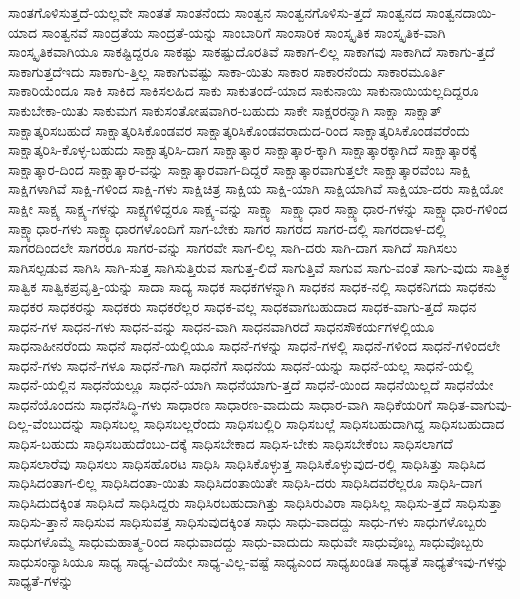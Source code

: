 {ಸಾಂತಗೊಳಿಸುತ್ತದೆ-ಯಲ್ಲವೇ
ಸಾಂತತೆ
ಸಾಂತನೆಂದು
ಸಾಂತ್ವನ
ಸಾಂತ್ವನಗೊಳಿಸು-ತ್ತದೆ
ಸಾಂತ್ವನದ
ಸಾಂತ್ವನದಾಯಿ-ಯಾದ
ಸಾಂತ್ವನವೆ
ಸಾಂದ್ರತೆಯ
ಸಾಂದ್ರತೆ-ಯನ್ನು
ಸಾಂಬಾರಿಗೆ
ಸಾಂಸಾರಿಕ
ಸಾಂಸ್ಕೃತಿಕ
ಸಾಂಸ್ಕೃತಿಕ-ವಾಗಿ
ಸಾಂಸ್ಕೃತಿಕವಾಗಿಯೂ
ಸಾಕಷ್ಟಿದ್ದರೂ
ಸಾಕಷ್ಟು
ಸಾಕಷ್ಟುದೊರತಿವೆ
ಸಾಕಾಗ-ಲಿಲ್ಲ
ಸಾಕಾಗವು
ಸಾಕಾಗಿದೆ
ಸಾಕಾಗು-ತ್ತದೆ
ಸಾಕಾಗುತ್ತದೆಇದು
ಸಾಕಾಗು-ತ್ತಿಲ್ಲ
ಸಾಕಾಗುವಷ್ಟು
ಸಾಕಾ-ಯಿತು
ಸಾಕಾರ
ಸಾಕಾರನೆಂದು
ಸಾಕಾರಮೂರ್ತಿ
ಸಾಕಾರಿಯೆಂದೂ
ಸಾಕಿ
ಸಾಕಿದ
ಸಾಕಿಸಲಹಿದ
ಸಾಕು
ಸಾಕುತಂದೆ-ಯಾದ
ಸಾಕುನಾಯಿ
ಸಾಕುನಾಯಿಯಲ್ಲದಿದ್ದರೂ
ಸಾಕುಬೇಕಾ-ಯಿತು
ಸಾಕುಮಗ
ಸಾಕುಸಂತೋಷವಾಗಿರ-ಬಹುದು
ಸಾಕೇ
ಸಾಕ್ಷರರನ್ನಾಗಿ
ಸಾಕ್ಷಾ
ಸಾಕ್ಷಾತ್
ಸಾಕ್ಷಾತ್ಕರಿಸಬಹುದೆ
ಸಾಕ್ಷಾತ್ಕರಿಸಿಕೊಂಡವರ
ಸಾಕ್ಷಾತ್ಕರಿಸಿಕೊಂಡವರಾದುದ-ರಿಂದ
ಸಾಕ್ಷಾತ್ಕರಿಸಿಕೊಂಡವರೆಂದು
ಸಾಕ್ಷಾತ್ಕರಿಸಿ-ಕೊಳ್ಳ-ಬಹುದು
ಸಾಕ್ಷಾತ್ಕರಿಸಿ-ದಾಗ
ಸಾಕ್ಷಾತ್ಕಾರ
ಸಾಕ್ಷಾತ್ಕಾರ-ಕ್ಕಾಗಿ
ಸಾಕ್ಷಾತ್ಕಾರಕ್ಕಾಗಿದೆ
ಸಾಕ್ಷಾತ್ಕಾರಕ್ಕೆ
ಸಾಕ್ಷಾತ್ಕಾರ-ದಿಂದ
ಸಾಕ್ಷಾತ್ಕಾರ-ವನ್ನು
ಸಾಕ್ಷಾತ್ಕಾರವಾಗ-ದಿದ್ದರೆ
ಸಾಕ್ಷಾತ್ಕಾರವಾಗುತ್ತಲೇ
ಸಾಕ್ಷಾತ್ಕಾರವೆಂಬ
ಸಾಕ್ಷಿ
ಸಾಕ್ಷಿಗಳಾಗಿವೆ
ಸಾಕ್ಷಿ-ಗಳಿಂದ
ಸಾಕ್ಷಿ-ಗಳು
ಸಾಕ್ಷಿಚಿತ್ರ
ಸಾಕ್ಷಿಯ
ಸಾಕ್ಷಿ-ಯಾಗಿ
ಸಾಕ್ಷಿಯಾಗಿವೆ
ಸಾಕ್ಷಿಯಾ-ದರು
ಸಾಕ್ಷಿಯೋ
ಸಾಕ್ಷೀ
ಸಾಕ್ಷ್ಯ
ಸಾಕ್ಷ್ಯ-ಗಳನ್ನು
ಸಾಕ್ಷ್ಯಗಳಿದ್ದರೂ
ಸಾಕ್ಷ್ಯ-ವನ್ನು
ಸಾಕ್ಷ್ಯಾ
ಸಾಕ್ಷ್ಯಾಧಾರ
ಸಾಕ್ಷ್ಯಾಧಾರ-ಗಳನ್ನು
ಸಾಕ್ಷ್ಯಾಧಾರ-ಗಳಿಂದ
ಸಾಕ್ಷ್ಯಾಧಾರ-ಗಳು
ಸಾಕ್ಷ್ಯಾಧಾರಗಳೊಂದಿಗೆ
ಸಾಗ-ಬೇಕು
ಸಾಗರ
ಸಾಗರದ
ಸಾಗರ-ದಲ್ಲಿ
ಸಾಗರದಾಳ-ದಲ್ಲಿ
ಸಾಗರದಿಂದಲೇ
ಸಾಗರರೂ
ಸಾಗರ-ವನ್ನು
ಸಾಗರವೇ
ಸಾಗ-ಲಿಲ್ಲ
ಸಾಗಿ-ದರು
ಸಾಗಿ-ದಾಗ
ಸಾಗಿದೆ
ಸಾಗಿಸಲು
ಸಾಗಿಸಲ್ಪಡುವ
ಸಾಗಿಸಿ
ಸಾಗಿ-ಸುತ್ತ
ಸಾಗಿಸುತ್ತಿರುವ
ಸಾಗುತ್ತ-ಲಿದೆ
ಸಾಗುತ್ತಿವೆ
ಸಾಗುವ
ಸಾಗು-ವಂತೆ
ಸಾಗು-ವುದು
ಸಾತ್ತ್ವಿಕ
ಸಾತ್ವಿಕ
ಸಾತ್ವಿಕಪ್ರವೃತ್ತಿ-ಯನ್ನು
ಸಾದಾ
ಸಾದ್ಯ
ಸಾಧಕ
ಸಾಧಕಗಳನ್ನಾಗಿ
ಸಾಧಕನ
ಸಾಧಕ-ನಲ್ಲಿ
ಸಾಧಕನಿಗದು
ಸಾಧಕನು
ಸಾಧಕರ
ಸಾಧಕರನ್ನು
ಸಾಧಕರು
ಸಾಧಕರೆಲ್ಲರ
ಸಾಧಕ-ವಲ್ಲ
ಸಾಧಕವಾಗಬಹುದಾದ
ಸಾಧಕ-ವಾಗು-ತ್ತದೆ
ಸಾಧನ
ಸಾಧನ-ಗಳ
ಸಾಧನ-ಗಳು
ಸಾಧನ-ವನ್ನು
ಸಾಧನ-ವಾಗಿ
ಸಾಧನವಾಗಿರದೆ
ಸಾಧನಸೌಕರ್ಯಗಳಲ್ಲಿಯೂ
ಸಾಧನಾಹೀನರೆಂದು
ಸಾಧನೆ
ಸಾಧನೆ-ಯಲ್ಲಿಯೂ
ಸಾಧನೆ-ಗಳನ್ನು
ಸಾಧನೆ-ಗಳಲ್ಲಿ
ಸಾಧನೆ-ಗಳಿಂದ
ಸಾಧನೆ-ಗಳಿಂದಲೇ
ಸಾಧನೆ-ಗಳು
ಸಾಧನೆ-ಗಳೂ
ಸಾಧನೆ-ಗಾಗಿ
ಸಾಧನೆಗೆ
ಸಾಧನೆಯ
ಸಾಧನೆ-ಯನ್ನು
ಸಾಧನೆ-ಯಲ್ಲ
ಸಾಧನೆ-ಯಲ್ಲಿ
ಸಾಧನೆ-ಯಲ್ಲಿನ
ಸಾಧನೆಯಲ್ಲೂ
ಸಾಧನೆ-ಯಾಗಿ
ಸಾಧನೆಯಾಗು-ತ್ತದೆ
ಸಾಧನೆ-ಯಿಂದ
ಸಾಧನೆಯಿಲ್ಲದೆ
ಸಾಧನೆಯೇ
ಸಾಧನೆಯೊಂದನು
ಸಾಧನೆಸಿದ್ಧಿ-ಗಳು
ಸಾಧಾರಣ
ಸಾಧಾರಣ-ವಾದುದು
ಸಾಧಾರ-ವಾಗಿ
ಸಾಧಿಕೆಯರಿಗೆ
ಸಾಧಿತ-ವಾಗುವು-ದಿಲ್ಲ-ವೆಂಬುದನ್ನು
ಸಾಧಿಸಬಲ್ಲ
ಸಾಧಿಸಬಲ್ಲರೆಂದು
ಸಾಧಿಸಬಲ್ಲಿರಿ
ಸಾಧಿಸಬಲ್ಲೆ
ಸಾಧಿಸಬಹುದಾಗಿದ್ದ
ಸಾಧಿಸಬಹುದಾದ
ಸಾಧಿಸ-ಬಹುದು
ಸಾಧಿಸಬಹುದೆಂಬು-ದಕ್ಕೆ
ಸಾಧಿಸಬೇಕಾದ
ಸಾಧಿಸ-ಬೇಕು
ಸಾಧಿಸಬೇಕೆಂಬ
ಸಾಧಿಸಲಾಗದೆ
ಸಾಧಿಸಲಾರೆವು
ಸಾಧಿಸಲು
ಸಾಧಿಸಹೊರಟ
ಸಾಧಿಸಿ
ಸಾಧಿಸಿಕೊಳ್ಳುತ್ತ
ಸಾಧಿಸಿಕೊಳ್ಳುವುದ-ರಲ್ಲಿ
ಸಾಧಿಸಿತ್ತು
ಸಾಧಿಸಿದ
ಸಾಧಿಸಿದಂತಾಗ-ಲಿಲ್ಲ
ಸಾಧಿಸಿದಂತಾ-ಯಿತು
ಸಾಧಿಸಿದಂತಾಯಿತೇ
ಸಾಧಿಸಿ-ದರು
ಸಾಧಿಸಿದವರೆಲ್ಲರೂ
ಸಾಧಿಸಿ-ದಾಗ
ಸಾಧಿಸಿದುದಕ್ಕಿಂತ
ಸಾಧಿಸಿದೆ
ಸಾಧಿಸಿದ್ದರು
ಸಾಧಿಸಿರಬಹುದಾಗಿತ್ತು
ಸಾಧಿಸಿರುವಿರಾ
ಸಾಧಿಸಿಲ್ಲ
ಸಾಧಿಸು-ತ್ತದೆ
ಸಾಧಿಸುತ್ತಾ
ಸಾಧಿಸು-ತ್ತಾನೆ
ಸಾಧಿಸುವ
ಸಾಧಿಸುವತ್ತ
ಸಾಧಿಸುವುದಕ್ಕಿಂತ
ಸಾಧು
ಸಾಧು-ವಾದದ್ದು
ಸಾಧು-ಗಳು
ಸಾಧುಗಳೊಬ್ಬರು
ಸಾಧುಗಳೊಮ್ಮೆ
ಸಾಧುಮಹಾತ್ಮ-ರಿಂದ
ಸಾಧುವಾದದ್ದು
ಸಾಧು-ವಾದುದು
ಸಾಧುವೇ
ಸಾಧುವೊಬ್ಬ
ಸಾಧುವೊಬ್ಬರು
ಸಾಧುಸಂನ್ಯಾಸಿಯೂ
ಸಾಧ್ಯ
ಸಾಧ್ಯ-ವಿದೆಯೇ
ಸಾಧ್ಯ-ವಿಲ್ಲ-ವಷ್ಟೆ
ಸಾಧ್ಯಎಂದ
ಸಾಧ್ಯಖಂಡಿತ
ಸಾಧ್ಯತೆ
ಸಾಧ್ಯತೆಇವು-ಗಳನ್ನು
ಸಾಧ್ಯತೆ-ಗಳನ್ನು
}
